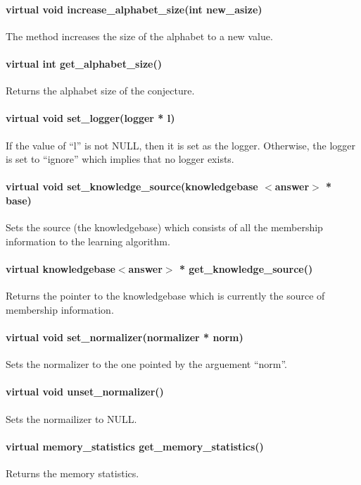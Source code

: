\paragraph{virtual void increase\_alphabet\_size(int new\_asize)}
The method increases the size of the alphabet to a new value.

\paragraph{virtual int get\_alphabet\_size()}
Returns the alphabet size of the conjecture.

\paragraph{virtual void set\_logger(logger * l)}
If the value of ``l'' is not NULL, then it is set as the logger. Otherwise, the logger is set to ``ignore'' which implies that no logger exists.

\paragraph{virtual void set\_knowledge\_source(knowledgebase $<$answer$>$ * base)}
Sets the source (the knowledgebase) which consists of all the membership information to the learning algorithm.

\paragraph{virtual knowledgebase$<$answer$>$ * get\_knowledge\_source()}
Returns the pointer to the knowledgebase which is currently the source of membership information.

\paragraph{virtual void set\_normalizer(normalizer * norm)}
Sets the normalizer to the one pointed by the arguement ``norm''.

\paragraph{virtual void unset\_normalizer()}
Sets the normailizer to NULL. 

\paragraph{virtual memory\_statistics get\_memory\_statistics()}
Returns the memory statistics.

